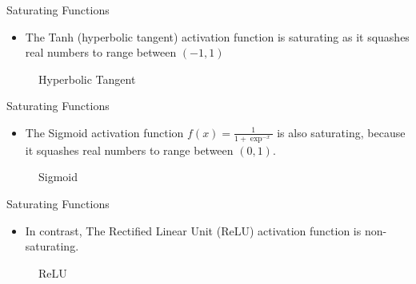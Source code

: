 \documentclass[compress,oilve,t]{beamer}
\begin{document}
\begin{frame}{Saturating Functions}
	\begin{itemize}
		\item The Tanh (hyperbolic tangent) activation function is saturating as it squashes real numbers to range between $(-1, 1)$
	\end{itemize}
	\begin{figure}[H]
		\centering
		\caption{Hyperbolic Tangent}
	\end{figure}
\end{frame}

\begin{frame}{Saturating Functions}
	\begin{itemize}
		\item The Sigmoid activation function  $f(x) = \frac{1}{1+\exp^{-x}}$ is also saturating, because it squashes real numbers to range between $(0, 1)$.
	\end{itemize}
	\begin{figure}[H]
		\centering
		\caption{Sigmoid}
	\end{figure}
\end{frame}

\begin{frame}{Saturating Functions}
	\begin{itemize}
		\item In contrast, The Rectified Linear Unit (ReLU) activation function is non-saturating.
	\end{itemize}
	\begin{figure}[H]
		\centering
		\caption{ReLU}
	\end{figure}
\end{frame}
\end{document}
